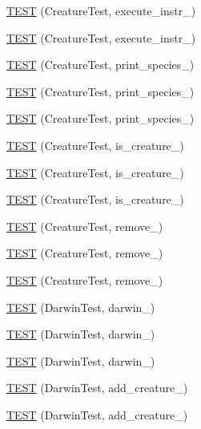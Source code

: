 \begin{DoxyCompactItemize}
\item 
\hyperlink{TestDarwin_8c_09_09_a71d83ff67c92c0166b51cc61ddc4a346}{T\-E\-S\-T} (Creature\-Test, execute\-\_\-instr\-\_)
\item 
\hyperlink{TestDarwin_8c_09_09_a58904813077de4324745bcc3e7cac93b}{T\-E\-S\-T} (Creature\-Test, execute\-\_\-instr\-\_)
\item 
\hyperlink{TestDarwin_8c_09_09_aca37ccb1151923a2e7a2991f7a49db46}{T\-E\-S\-T} (Creature\-Test, print\-\_\-species\-\_)
\item 
\hyperlink{TestDarwin_8c_09_09_a15400f3e6656978a3d853772347ea004}{T\-E\-S\-T} (Creature\-Test, print\-\_\-species\-\_)
\item 
\hyperlink{TestDarwin_8c_09_09_ad2fe91a31e7045977f25158dbf15c082}{T\-E\-S\-T} (Creature\-Test, print\-\_\-species\-\_)
\item 
\hyperlink{TestDarwin_8c_09_09_aa79db487ef9da5c152ba9cd34d10bebb}{T\-E\-S\-T} (Creature\-Test, is\-\_\-creature\-\_)
\item 
\hyperlink{TestDarwin_8c_09_09_a68d515ac4113b1780caa78bbe6ddba0d}{T\-E\-S\-T} (Creature\-Test, is\-\_\-creature\-\_)
\item 
\hyperlink{TestDarwin_8c_09_09_a263773ee46c6c18ae5c5cf8d04de7a26}{T\-E\-S\-T} (Creature\-Test, is\-\_\-creature\-\_)
\item 
\hyperlink{TestDarwin_8c_09_09_ad0f18e8894e448f9930a819e3967c183}{T\-E\-S\-T} (Creature\-Test, remove\-\_)
\item 
\hyperlink{TestDarwin_8c_09_09_a32612ea420ee60d5c1dff50afa147dbd}{T\-E\-S\-T} (Creature\-Test, remove\-\_)
\item 
\hyperlink{TestDarwin_8c_09_09_aeda2c44cffdf81ae377fbf3e696b463f}{T\-E\-S\-T} (Creature\-Test, remove\-\_)
\item 
\hyperlink{TestDarwin_8c_09_09_aaaee642250e432647ec9fec615f892f6}{T\-E\-S\-T} (Darwin\-Test, darwin\-\_)
\item 
\hyperlink{TestDarwin_8c_09_09_a3ffd3212a95b294bb913e08cc2231e44}{T\-E\-S\-T} (Darwin\-Test, darwin\-\_)
\item 
\hyperlink{TestDarwin_8c_09_09_abffec75a0fd786ee2cb5caaa0ad820df}{T\-E\-S\-T} (Darwin\-Test, darwin\-\_)
\item 
\hyperlink{TestDarwin_8c_09_09_ac67bafe3569f40f6f27010341aab1728}{T\-E\-S\-T} (Darwin\-Test, add\-\_\-creature\-\_)
\item 
\hyperlink{TestDarwin_8c_09_09_ada0d2ac22873c7bcbe999eb6e6754e86}{T\-E\-S\-T} (Darwin\-Test, add\-\_\-creature\-\_)

\end{DoxyCompactItemize}
